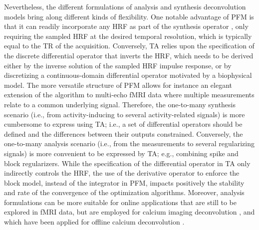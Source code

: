 Nevertheless, the different formulations of analysis and synthesis deconvolution
models bring along different kinds of flexibility. One notable advantage of PFM
is that it can readily incorporate any HRF as part of the synthesis operator
\citep{Elad2007Analysisversussynthesis}, only requiring the sampled HRF at
the desired temporal resolution, which is typically equal to the TR of the
acquisition. Conversely, TA relies upon the specification of the discrete
differential operator that inverts the HRF, which needs to be derived either by
the inverse solution of the sampled HRF impulse response, or by discretizing a
continuous-domain differential operator motivated by a biophysical model. The
more versatile structure of PFM allows for instance an elegant extension of the
algorithm to multi-echo fMRI data
\citep{CaballeroGaudes2019deconvolutionalgorithmmulti} where multiple
measurements relate to a common underlying signal. Therefore, the one-to-many
synthesis scenario (i.e., from activity-inducing to several activity-related
signals) is more cumbersome to express using TA; i.e., a set of differential
operators should be defined and the differences between their outputs
constrained. Conversely, the one-to-many analysis scenario (i.e., from the
measurements to several regularizing signals) is more convenient to be expressed
by TA; e.g., combining spike and block regularizers. While the specification of
the differential operator in TA only indirectly controls the HRF, the use of the
derivative operator to enforce the block model, instead of the integrator in
PFM, impacts positively the stability and rate of the convergence of the
optimization algorithms. Moreover, analysis formulations can be more suitable
for online applications that are still to be explored in fMRI data, but are
employed for calcium imaging deconvolution
\citep{Friedrich_2017,Jewell_2019}, and which have been applied for offline
calcium deconvolution \citep{Farouj2020DeconvolutionSustainedNeural}.

